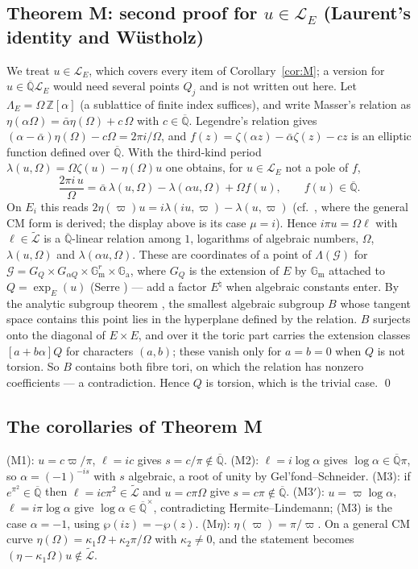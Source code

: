 \documentclass[11pt]{amsart}
\theoremstyle{definition}
\newcommand{\Qb}{\overline{\mathbb{Q}}}
\newcommand{\Z}{\mathbb{Z}}
\newcommand{\Ga}{\mathbb{G}_{\mathrm a}}
\newcommand{\Gm}{\mathbb{G}_{\mathrm m}}
\newcommand{\Lg}{\mathcal{L}}
\newcommand{\Lt}{\widetilde{\mathcal{L}}}
\newcommand{\vp}{\varpi}
\begin{document}
\subsection{Theorem M: second proof for $u\in\Lg_E$ (Laurent's identity and W\"ustholz)}\label{sec:M2}
We treat $u\in\Lg_E$, which covers every item of Corollary~\ref{cor:M}; a version for $u\in\Qb\Lg_E$ would need several
points $Q_j$ and is not written out here.
Let $\Lambda_E=\Omega\,\Z[\alpha]$ (a sublattice of finite index suffices), and write Masser's relation \cite{Ma75} as
$\eta(\alpha\Omega)=\bar\alpha\eta(\Omega)+c\,\Omega$ with $c\in\Qb$. Legendre's relation gives
$(\alpha-\bar\alpha)\eta(\Omega)-c\Omega=2\pi i/\Omega$, and $f(z)=\zeta(\alpha z)-\bar\alpha\zeta(z)-cz$ is an elliptic
function defined over $\Qb$. With the third-kind period $\lambda(u,\Omega)=\Omega\zeta(u)-\eta(\Omega)u$ one obtains, for
$u\in\Lg_E$ not a pole of $f$,
\begin{equation}\label{eq:laurent}
\frac{2\pi i\,u}{\Omega}=\bar\alpha\,\lambda(u,\Omega)-\lambda(\alpha u,\Omega)+\Omega f(u),\qquad f(u)\in\Qb .
\end{equation}
On $E_i$ this reads $2\eta(\vp)u=i\lambda(iu,\vp)-\lambda(u,\vp)$ (cf.\ \cite[\S9, p.~160]{La82}, where the general CM
form is derived; the display above is its case $\mu=i$). Hence $i\pi u=\Omega\ell$ with
$\ell\in\Lt$ is a $\Qb$-linear relation among $1$, logarithms of algebraic numbers, $\Omega$, $\lambda(u,\Omega)$ and
$\lambda(\alpha u,\Omega)$. These are coordinates of a point of $\Lambda(\mathcal G)$ for
$\mathcal G=G_Q\times G_{\alpha Q}\times\Gm^r\times\Ga$, where $G_Q$ is the extension of $E$ by $\Gm$ attached to
$Q=\exp_E(u)$ (Serre \cite{Se79}) --- add a factor $E^\natural$ when algebraic constants enter. By the analytic subgroup theorem \cite{Wu89}, the
smallest algebraic subgroup $B$ whose tangent space contains this point lies in the hyperplane defined by the relation.
$B$ surjects onto the diagonal of $E\times E$, and over it the toric part carries the extension classes
$[a+b\alpha]Q$ for characters $(a,b)$; these vanish only for $a=b=0$ when $Q$ is not torsion. So $B$ contains both fibre
tori, on which the relation has nonzero coefficients --- a contradiction. Hence $Q$ is torsion, which is the trivial
case. \qed


\subsection{The corollaries of Theorem M}
(M1): $u=c\vp/\pi$, $\ell=ic$ gives $s=c/\pi\notin\Qb$. (M2): $\ell=i\log\alpha$ gives $\log\alpha\in\Qb\pi$, so
$\alpha=(-1)^{-is}$ with $s$ algebraic, a root of unity by Gel'fond--Schneider. (M3): if $e^{\pi^2}\in\Qb$ then
$\ell=ic\pi^2\in\Lt$ and $u=c\pi\Omega$ give $s=c\pi\notin\Qb$. (M3$'$): $u=\vp\log\alpha$, $\ell=i\pi\log\alpha$ give
$\log\alpha\in\Qb^\times$, contradicting Hermite--Lindemann; (M3) is the case $\alpha=-1$, using $\wp(iz)=-\wp(z)$. (M$\eta$):
$\eta(\vp)=\pi/\vp$. On a general CM curve $\eta(\Omega)=\kappa_1\Omega+\kappa_2\pi/\Omega$ with $\kappa_2\ne0$, and the
statement becomes $(\eta-\kappa_1\Omega)u\notin\Lt$.
\end{document}
